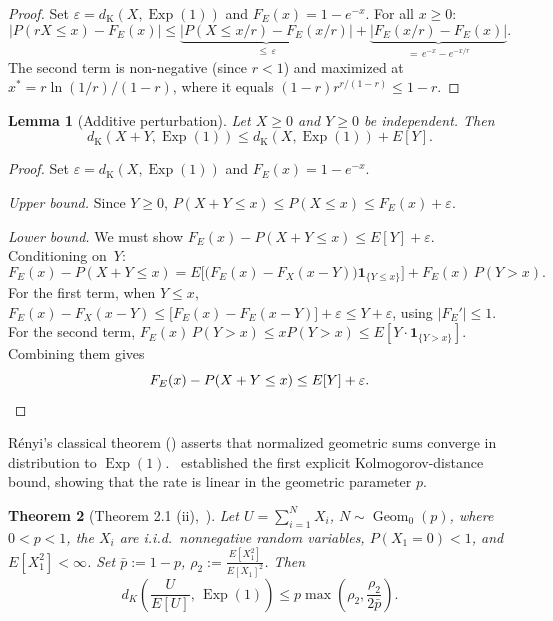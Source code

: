 \documentclass[11pt]{article}
\theoremstyle{plain}
\newtheorem{theorem}{Theorem}[section]
\newtheorem{lemma}[theorem]{Lemma}
\theoremstyle{definition}
\theoremstyle{remark}
\DeclareMathOperator{\Exp}{Exp}
\DeclareMathOperator{\Geom}{Geom}
\newcommand{\dK}{d_{\mathrm{K}}}
\begin{document}
\begin{proof}
Set $\varepsilon = \dK(X, \Exp(1))$ and $F_E(x) = 1-e^{-x}$.  For all $x \geq 0$:
\[
  |P(rX \leq x) - F_E(x)| \leq \underbrace{|P(X \leq x/r) - F_E(x/r)|}_{\leq\, \varepsilon} + \underbrace{|F_E(x/r) - F_E(x)|}_{=\, e^{-x} - e^{-x/r}}.
\]
The second term is non-negative (since $r < 1$) and maximized at $x^* = r\ln(1/r)/(1-r)$, where it equals $(1-r)r^{r/(1-r)} \leq 1-r$.
\end{proof}

\begin{lemma}[Additive perturbation]\label{lem:additive}
Let $X \geq 0$ and $Y \geq 0$ be independent. Then
\[
  \dK(X+Y, \Exp(1)) \leq \dK(X, \Exp(1)) + E[Y].
\]
\end{lemma}


\begin{proof}
Set $\varepsilon = \dK(X, \Exp(1))$ and $F_E(x) = 1 - e^{-x}$.

\emph{Upper bound.}\; Since $Y \geq 0$, $P(X+Y \leq x) \leq P(X \leq x) \leq F_E(x) + \varepsilon$.

\emph{Lower bound.}\; We must show $F_E(x) - P(X+Y \leq x) \leq E[Y] + \varepsilon$.  Conditioning on~$Y$:
\[
  F_E(x) - P(X+Y \leq x)
  = E\bigl[\bigl(F_E(x)-F_X(x-Y)\bigr)\mathbf 1_{\{Y\le x\}}\bigr]
  + F_E(x)\,P(Y > x).
\]
For the first term, when $Y \leq x$, $F_E(x) - F_X(x-Y)
  \leq \bigl[F_E(x) - F_E(x-Y)\bigr] + \varepsilon
  \leq Y + \varepsilon$, using $|F_E'| \leq 1$.  For the second term, $F_E(x)\,P(Y > x) \leq x P(Y> x) \leq E[Y \cdot \mathbf 1_{\{Y> x\}}]$. Combining them gives
\[
  F_E(x) - P(X+Y \leq x) \leq E[Y] + \varepsilon.  \qedhere
\]
\end{proof}




R\'enyi's classical theorem (\cite{Renyi56}) asserts that normalized geometric sums converge in distribution to $\Exp(1)$.~\cite{Brown90} established the first explicit Kolmogorov-distance bound, showing that the rate is linear in the geometric parameter $p$. 


\begin{theorem}[Theorem 2.1 (ii),~\cite{Brown90}]\label{thm:Brown}
Let $U=\sum_{i=1}^{N} X_i$, $N\sim \Geom_0(p)$, where \(0<p<1\), the \(X_i\) are i.i.d.\ nonnegative random variables, \(P(X_1=0)<1\), and \(E[X_1^2]<\infty\). Set $\bar p:=1-p$,
$\rho_2:=\frac{E[X_1^2]}{E[X_1]^2}$.
Then
\begin{equation}\label{eq:Brown-geom-our}
d_K\!\left(\frac{U}{E[U]},\,\Exp(1)\right)
\le
p\max\!\left(\rho_2,\frac{\rho_2}{2\bar p}\right).
\end{equation}
\end{theorem}
\end{document}

